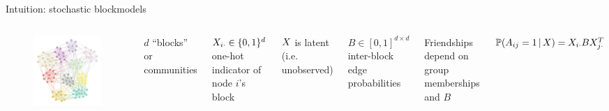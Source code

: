 \documentclass{beamer}
\theoremstyle{remark}
\begin{document}
\begin{frame}{Intuition: stochastic blockmodels}

    \begin{columns}

        \begin{figure}
            \includegraphics[width=\textwidth]{figures/assortative.png}
        \end{figure}


        $d$ ``blocks'' or communities

        $X_{i \cdot} \in \{0, 1\}^d$ one-hot indicator of node $i$'s block

        \vspace{4mm}

        $X$ is latent (i.e. unobserved)

        \vspace{4mm}

        $B \in [0, 1]^{d \times d}$ inter-block edge probabilities

        \vspace{4mm}

        Friendships depend on group memberships and $B$

        $\P[\X]{A_{ij} = 1} = \X_{i \cdot} B \X_{j \cdot}^T$

    \end{columns}

\end{frame}
\end{document}
